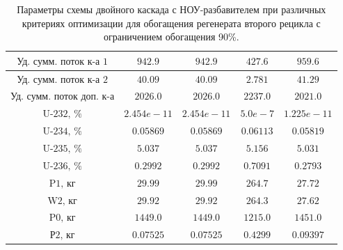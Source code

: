 \begin{table}
\begin{tabular}{ccccc}
        $\text{Уд. сумм. поток к-а 1}$ & $942.9$ & $942.9$ & $427.6$ & $959.6$\\ \hline
        $\text{Уд. сумм. поток к-а 2}$ & $40.09$ & $40.09$ & $2.781$ & $41.29$\\ \hline
        $\text{Уд. сумм. поток доп. к-а}$ & $2026.0$ & $2026.0$ & $2237.0$ & $2021.0$\\ \hline
        $\text{U-232, \%}$ & $2.454e-11$ & $2.454e-11$ & $5.0e-7$ & $1.225e-11$\\ \hline
        $\text{U-234, \%}$ & $0.05869$ & $0.05869$ & $0.06113$ & $0.05819$\\ \hline
        $\text{U-235, \%}$ & $5.037$ & $5.037$ & $5.156$ & $5.031$\\ \hline
        $\text{U-236, \%}$ & $0.2992$ & $0.2992$ & $0.7091$ & $0.2793$\\ \hline
        $\text{P1, кг}$ & $29.99$ & $29.99$ & $264.7$ & $27.72$\\ \hline
        $\text{W2, кг}$ & $29.92$ & $29.92$ & $264.3$ & $27.62$\\ \hline
        $\text{P0, кг}$ & $1449.0$ & $1449.0$ & $1215.0$ & $1451.0$\\ \hline
        $\text{Р2, кг}$ & $0.07525$ & $0.07525$ & $0.4299$ & $0.09397$\\ \hline
    \end{tabular}       
\caption{Параметры схемы двойного каскада с НОУ-разбавителем при различных критериях оптимизации для обогащения регенерата второго рецикла с ограничением обогащения 90\%.{\label{2opt2_90}}}
\end{table}

